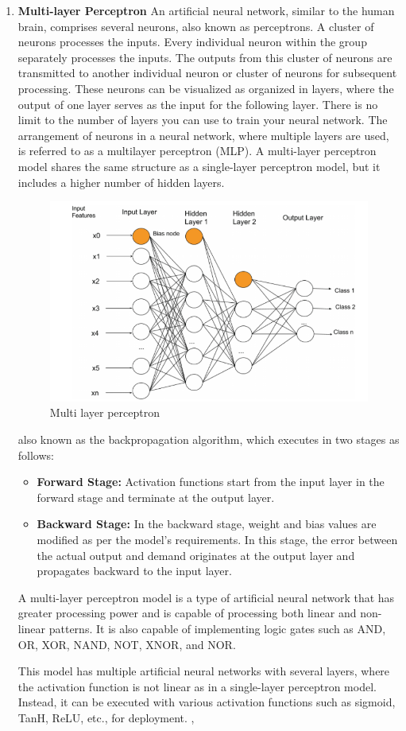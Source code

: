 \begin{enumerate}
        \item \textbf{Multi-layer Perceptron} An artificial neural network, similar to the human brain, comprises several neurons, also known as perceptrons. A cluster of neurons processes the inputs. Every individual neuron within the group separately processes the inputs. The outputs from this cluster of neurons are transmitted to another individual neuron or cluster of neurons for subsequent processing. These neurons can be visualized as organized in layers, where the output of one layer serves as the input for the following layer. There is no limit to the number of layers you can use to train your neural network. The arrangement of neurons in a neural network, where multiple layers are used, is referred to as a multilayer perceptron (MLP). A multi-layer perceptron model shares the same structure as a single-layer perceptron model, but it includes a higher number of hidden layers.
    \begin{figure}[H]
        \centering
        \includegraphics[width=0.8\linewidth]{tex/img/MLP.PNG}
        \caption{Multi layer perceptron \cite{ansari2020building}}
        \label{fig:MLP}
    \end{figure}
also known as the backpropagation algorithm, which executes in two stages as follows:
    \begin{itemize}
        \item \textbf{Forward Stage:} Activation functions start from the input layer in the forward stage and terminate at the output layer.
        \item \textbf{Backward Stage:} In the backward stage, weight and bias values are modified as per the model's requirements. In this stage, the error between the actual output and demand originates at the output layer and propagates backward to the input layer.
    \end{itemize}
A multi-layer perceptron model is a type of artificial neural network that has greater processing power and is capable of processing both linear and non-linear patterns. It is also capable of implementing logic gates such as AND, OR, XOR, NAND, NOT, XNOR, and NOR.

This model has multiple artificial neural networks with several layers, where the activation function is not linear as in a single-layer perceptron model. Instead, it can be executed with various activation functions such as sigmoid, TanH, ReLU, etc., for deployment. \cite{ansari2020building}, \cite{nielsen2015neural}
\end{enumerate}

